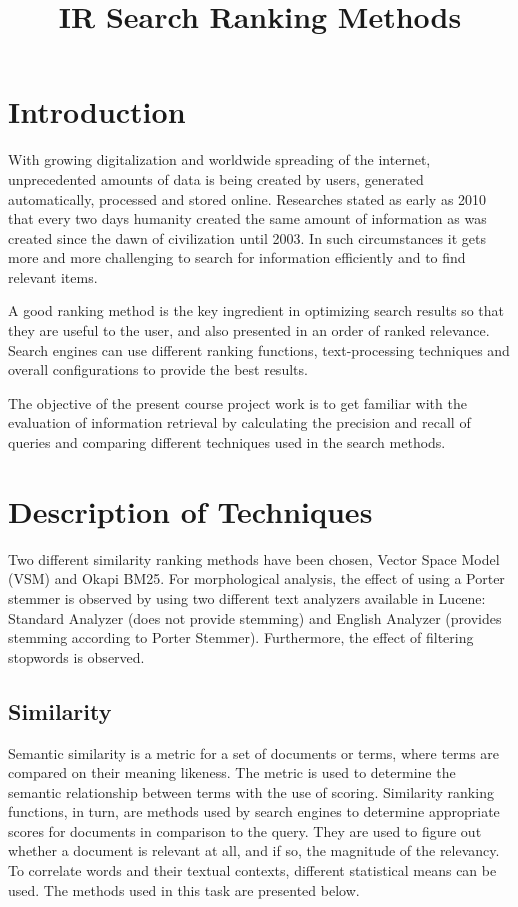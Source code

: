 \documentclass[parskip=full]{aaltoseries}
\begin{document}
\title{IR Search Ranking Methods}

\tableofcontents


\chapter{Introduction}
With growing digitalization and worldwide spreading of the internet, unprecedented amounts of data is being created by users, generated automatically, processed and stored online. Researches stated as early as 2010 that every two days humanity created the same amount of information as was created since the dawn of civilization until 2003. In such circumstances it gets more and more challenging to search for information efficiently and to find relevant items.

A good ranking method is the key ingredient in optimizing search results so that they are useful to the user, and also presented in an order of ranked relevance. Search engines can use different ranking functions, text-processing techniques and overall configurations to provide the best results.

The objective of the present course project work is to get familiar with the evaluation of information retrieval by calculating the precision and recall of queries and comparing different techniques used in the search methods.

\chapter{Description of Techniques}
Two different similarity ranking methods have been chosen, Vector Space Model (VSM) and Okapi BM25. For morphological analysis, the effect of using a Porter stemmer is observed by using two different text analyzers available in Lucene: Standard Analyzer (does not provide stemming) and English Analyzer (provides stemming according to Porter Stemmer). Furthermore, the effect of filtering stopwords is observed.
\section{Similarity}
Semantic similarity is a metric for a set of documents or terms, where terms are compared on their meaning likeness. The metric is used to determine the semantic relationship between terms with the use of scoring. Similarity ranking functions, in turn, are methods used by search engines to determine appropriate scores for documents in comparison to the query. They are used to figure out whether a document is relevant at all, and if so, the magnitude of the relevancy. To correlate words and their textual contexts, different statistical means can be used. The methods used in this task are presented below.
\end{document}
